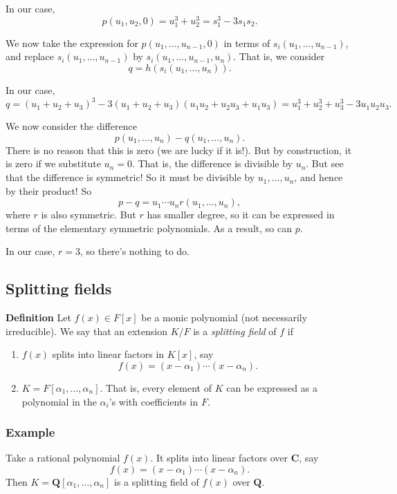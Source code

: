 \documentclass[11pt]{article}
\begin{document}
In our case,
\[p(u_{1},u_{2}, 0) = u_{1}^{3}+u_{2}^3 = s_{1}^{3}-3s_{1}s_{2}.\]

We now take the expression for \(p(u_{1}, \dots, u_{n-1}, 0)\) in terms of \(s_{i}(u_{1}, \dots, u_{n-1})\), and replace \(s_{i}(u_{1}, \dots, u_{n-1})\) by \(s_{i}(u_{1}, \dots, u_{n-1}, u_{n})\).
That is, we consider
\[ q = h(s_{i}(u_{1}, \dots, u_{n})).\]

In our case,
\[ q = (u_{1}+u_{2}+u_{3})^3 - 3(u_{1}+u_{2}+u_{3})(u_{1}u_{2} +u_{2}u_{3} + u_{1}u_{3}) = u_{1}^{3}+u_{2}^{3}+u_{3}^{3} - 3u_{1}u_{2}u_{3}. \]

We now consider the difference
\[ p(u_{1}, \dots, u_{n}) - q(u_{1}, \dots, u_{n}).\]
There is no reason that this is zero (we are lucky if it is!).
But by construction, it is zero if we substitute \(u_{n} = 0\).
That is, the difference is divisible by \(u_{n}\).
But see that the difference is symmetric!
So it must be divisible by \(u_{1}, \dots, u_{n}\), and hence by their product!
So
\[ p-q = u_{1}\cdots u_{n} r(u_{1}, \dots, u_{n}),\]
where \(r\) is also symmetric.
But \(r\) has smaller degree, so it can be expressed in terms of the elementary symmetric polynomials.
As a result, so can \(p\).

In our case, \(r = 3\), so there's nothing to do.
\subsection{Splitting fields}
\label{sec:orge7e06ad}
\textbf{Definition} Let \(f(x) \in F[x]\) be a monic polynomial (not necessarily irreducible).
We say that an extension \(K/F\) is a \emph{splitting field} of \(f\) if
\begin{enumerate}
\item \(f(x)\) splits into linear factors in \(K[x]\), say
\[ f(x) = (x-\alpha_{1}) \cdots (x-\alpha_{n}).\]
\item \(K = F[\alpha_1,\dots, \alpha_n].\)
That is, every element of \(K\) can be expressed as a polynomial in the \(\alpha_{i}\)'s with coefficients in \(F\).
\end{enumerate}
\subsubsection{Example}
\label{sec:org40c3c13}
Take a rational polynomial \(f(x)\).  It splits into linear factors over \(\mathbf{C}\), say
\[ f(x) = (x-\alpha_{1}) \cdots (x-\alpha_{n}).\]
Then \(K = \mathbf{Q}[\alpha_1,\dots,\alpha_n]\) is a splitting field of \(f(x)\) over \(\mathbf{Q}\).
\end{document}
